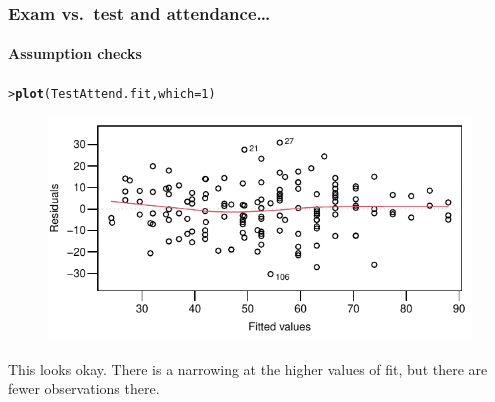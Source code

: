 \documentclass{beamer}\usepackage[]{graphicx}\usepackage[]{xcolor}
\makeatletter
\newcommand{\hlnum}[1]{\textcolor[rgb]{0.686,0.059,0.569}{#1}}%
\newcommand{\hlstd}[1]{\textcolor[rgb]{0.345,0.345,0.345}{#1}}%
\newcommand{\hlkwc}[1]{\textcolor[rgb]{0.333,0.667,0.333}{#1}}%
\newcommand{\hlkwd}[1]{\textcolor[rgb]{0.737,0.353,0.396}{\textbf{#1}}}%
\newenvironment{kframe}{%
 \def\at@end@of@kframe{}%
 \ifinner\ifhmode%
  \def\at@end@of@kframe{\end{minipage}}%
  \begin{minipage}{\columnwidth}%
 \fi\fi%
 \def\FrameCommand##1{\hskip\@totalleftmargin \hskip-\fboxsep
 \colorbox{shadecolor}{##1}\hskip-\fboxsep
     \hskip-\linewidth \hskip-\@totalleftmargin \hskip\columnwidth}%
 \MakeFramed {\advance\hsize-\width
   \@totalleftmargin\z@ \linewidth\hsize
   \@setminipage}}%
 {\par\unskip\endMakeFramed%
 \at@end@of@kframe}
\newenvironment{knitrout}{}{} %
\makeatother
\begin{document}
\begin{frame}[fragile]
\frametitle{Exam vs.\ test \textbf{and} attendance\ldots}
\framesubtitle{Assumption checks}

\begin{knitrout}\scriptsize
{}\color{fgcolor}\begin{kframe}
\begin{alltt}
\hlstd{> }\hlkwd{plot}\hlstd{(TestAttend.fit,}\hlkwc{which}\hlstd{=}\hlnum{1}\hlstd{)}
\end{alltt}
\end{kframe}
\end{knitrout}



\begin{figure}
  \centering
  \includegraphics{figure/RC-H08-012}
\end{figure}

This looks okay. There is a narrowing at the higher values of fit, but there are fewer observations there.
\end{frame}
\end{document}
